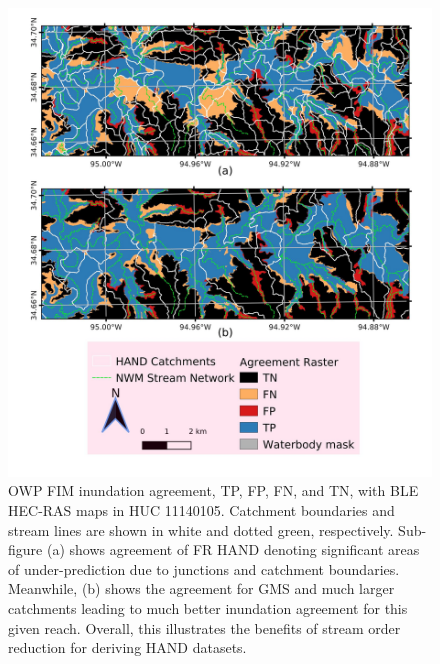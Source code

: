 \documentclass[draft]{dependencies/agujournal2019}
\begin{document}
%
%
\begin{figure}[h!]
\centering
\includegraphics[scale=1.0]{figures/gms_enhancement.jpg}
\caption{OWP FIM inundation agreement, TP, FP, FN, and TN, with BLE HEC-RAS maps in HUC 11140105.
Catchment boundaries and stream lines are shown in white and dotted green, respectively.
Sub-figure (a) shows agreement of FR HAND denoting significant areas of under-prediction due to junctions and catchment boundaries.
Meanwhile, (b) shows the agreement for GMS and much larger catchments leading to much better inundation agreement for this given reach. 
Overall, this illustrates the benefits of stream order reduction for deriving HAND datasets.
}
\label{fig:gms_enhancement}
\end{figure}
%
\clearpage %
\end{document}
